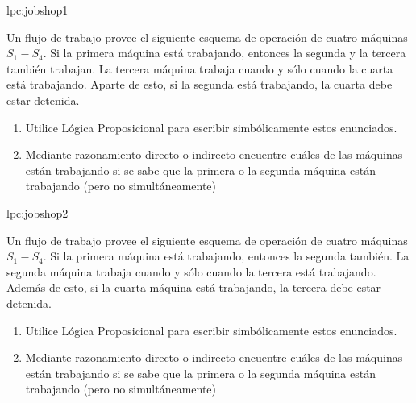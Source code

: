 \begin{defproblem}{lpc:jobshop1}%
 \begin{onlyproblem}%
 Un flujo de trabajo provee el siguiente esquema de operación de cuatro máquinas $ S_1-S_4 $. 
 Si la primera máquina está trabajando, entonces la segunda y la tercera también trabajan.
 La tercera máquina trabaja cuando y sólo cuando la cuarta está trabajando.
 Aparte de esto, si la segunda está trabajando, la cuarta debe estar detenida.
 \begin{enumerate}
 	\item Utilice Lógica Proposicional para escribir simbólicamente estos enunciados.%
 	\item Mediante razonamiento directo o indirecto encuentre cuáles de las máquinas están trabajando si se sabe que la primera o la segunda máquina están trabajando (pero no simultáneamente)%
 \end{enumerate}
 
 \end{onlyproblem}%
 \begin{onlysolution}%
 
 \end{onlysolution}
\end{defproblem}

\begin{defproblem}{lpc:jobshop2}%
 \begin{onlyproblem}%
 Un flujo de trabajo provee el siguiente esquema de operación de cuatro máquinas $ S_1-S_4 $. 
 Si la primera máquina está trabajando, entonces la segunda también.
 La segunda máquina trabaja cuando y sólo cuando la tercera está trabajando.
 Además de esto, si la cuarta máquina está trabajando, la tercera debe estar detenida.
 \begin{enumerate}
 	\item Utilice Lógica Proposicional para escribir simbólicamente estos enunciados.%
 	\item Mediante razonamiento directo o indirecto encuentre cuáles de las máquinas están trabajando si se sabe que la primera o la segunda máquina están trabajando (pero no simultáneamente)%
 \end{enumerate}
 
 \end{onlyproblem}%
 \begin{onlysolution}%
 
 \end{onlysolution}%
\end{defproblem}

